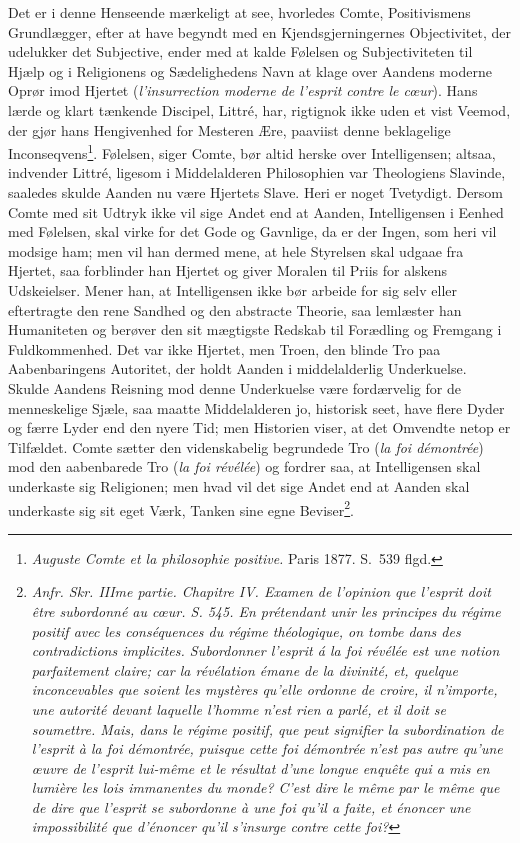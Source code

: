 \documentclass[12pt]{article}
\newcommand{\opage}[1]{\marginnote{\footnotesize\textit{[#1]}}}
\begin{document}
Det er i denne Henseende mærkeligt at see, hvorledes Comte,
Positivismens Grundlægger, efter at have begyndt med en
Kjendsgjerningernes Objectivitet, der udelukker det Subjective,
ender med at kalde Følelsen og Subjectiviteten til Hjælp og i
Religionens og Sædelighedens Navn at klage over Aandens moderne
Oprør imod Hjertet (\textit{l'insurrection moderne de l'esprit
contre le cœur}). Hans lærde og klart tænkende Discipel, Littré,
har, rigtignok ikke uden et vist Veemod, der gjør hans Hengivenhed
for Mesteren Ære, paaviist denne beklagelige Inconseqvens\footnote{%
\textit{Auguste Comte et la philosophie positive.} Paris 1877. S.\
539 flgd.}. Følelsen, siger Comte, bør altid herske over
Intelligensen; altsaa, indvender Littré, ligesom i Middelalderen
Philosophien var Theologiens Slavinde, saaledes skulde Aanden nu
være Hjertets Slave. Heri er noget Tvetydigt. Dersom Comte med sit
Udtryk ikke vil sige Andet end at Aanden, Intelligensen i Eenhed med
Følelsen, skal virke for det Gode og Gavnlige, da er der Ingen, som
\opage{65} heri vil modsige ham; men vil han dermed mene, at hele Styrelsen
skal udgaae fra Hjertet, saa forblinder han Hjertet og giver Moralen
til Priis for alskens Udskeielser. Mener han, at Intelligensen ikke
bør arbeide for sig selv eller eftertragte den rene Sandhed og den
abstracte Theorie, saa lemlæster han Humaniteten og berøver den sit
mægtigste Redskab til Forædling og Fremgang i Fuldkommenhed. Det var
ikke Hjertet, men Troen, den blinde Tro paa Aabenbaringens
Autoritet, der holdt Aanden i middelalderlig Underkuelse. Skulde
Aandens Reisning mod denne Underkuelse være fordærvelig for de
menneskelige Sjæle, saa maatte Middelalderen jo, historisk seet,
have flere Dyder og færre Lyder end den nyere Tid; men Historien
viser, at det Omvendte netop er Tilfældet. Comte sætter den
videnskabelig begrundede Tro (\textit{la foi démontrée}) mod den
aabenbarede Tro (\textit{la foi révélée}) og fordrer saa, at
Intelligensen skal underkaste sig Religionen; men hvad vil det sige
Andet end at Aanden skal underkaste sig sit eget Værk, Tanken sine
egne Beviser\footnote{\textit{Anfr. Skr. IIIme partie. Chapitre IV.
Examen de l'opinion que l'esprit doit être subordonné au cœur. S.
545. En prétendant unir les principes du régime positif avec les
conséquences du régime théologique, on tombe dans des contradictions
implicites. Subordonner l'esprit á la foi révélée est une notion
parfaitement claire; car la révélation émane de la divinité, et,
quelque inconcevables que soient les mystères qu'elle ordonne de
croire, il n'importe, une autorité devant laquelle l'homme n'est
rien a parlé, et il doit se soumettre. Mais, dans le régime positif,
que peut signifier la subordination de l'esprit à la foi démontrée,
puisque cette foi démontrée n'est pas autre qu'une œuvre de l'esprit
lui-même et le résultat d'une longue enquête qui a mis en lumière
les lois immanentes du monde? C'est dire le même par le même que de
dire que l'esprit se subordonne à une foi qu'il a faite, et énoncer
une impossibilité que d'énoncer qu'il s'insurge contre cette foi?}}.
\end{document}
